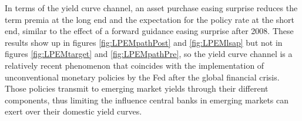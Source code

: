 {In terms of the yield curve channel, an asset purchase easing surprise reduces the term premia at the long end and the expectation for the policy rate at the short end, similar to the effect of a forward guidance easing surprise after 2008.
These results %
show up in figures \ref{fig:LPEMpathPost} and \ref{fig:LPEMlsap} but not in figures \ref{fig:LPEMtarget} and \ref{fig:LPEMpathPre}, %
so the yield curve channel is a relatively recent phenomenon that coincides with the implementation of unconventional monetary policies %
by the Fed after the global financial crisis. Those policies transmit to emerging market yields through their different components, thus limiting the influence central banks in emerging markets can exert over their domestic yield curves.



}
